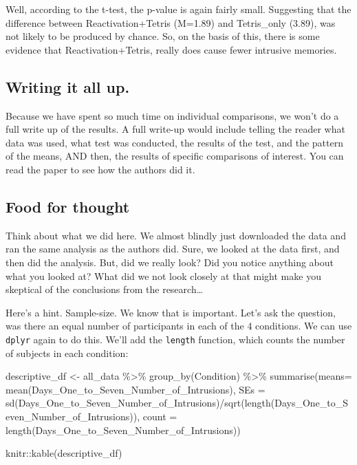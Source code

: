 \documentclass[
]{book}
\newenvironment{Shaded}{\begin{snugshade}}{\end{snugshade}}
\newcommand{\AttributeTok}[1]{\textcolor[rgb]{0.77,0.63,0.00}{#1}}
\newcommand{\FunctionTok}[1]{\textcolor[rgb]{0.00,0.00,0.00}{#1}}
\newcommand{\NormalTok}[1]{#1}
\newcommand{\OtherTok}[1]{\textcolor[rgb]{0.56,0.35,0.01}{#1}}
\newcommand{\SpecialCharTok}[1]{\textcolor[rgb]{0.00,0.00,0.00}{#1}}
\begin{document}
Well, according to the t-test, the p-value is again fairly small. Suggesting that the difference between Reactivation+Tetris (M=1.89) and Tetris\_only (3.89), was not likely to be produced by chance. So, on the basis of this, there is some evidence that Reactivation+Tetris, really does cause fewer intrusive memories.

\hypertarget{writing-it-all-up.}{%
\subsection{Writing it all up.}\label{writing-it-all-up.}}

Because we have spent so much time on individual comparisons, we won't do a full write up of the results. A full write-up would include telling the reader what data was used, what test was conducted, the results of the test, and the pattern of the means, AND then, the results of specific comparisons of interest. You can read the paper to see how the authors did it.

\hypertarget{food-for-thought}{%
\subsection{Food for thought}\label{food-for-thought}}

Think about what we did here. We almost blindly just downloaded the data and ran the same analysis as the authors did. Sure, we looked at the data first, and then did the analysis. But, did we really look? Did you notice anything about what you looked at? What did we not look closely at that might make you skeptical of the conclusions from the research\ldots{}

Here's a hint. Sample-size. We know that is important. Let's ask the question, was there an equal number of participants in each of the 4 conditions. We can use \texttt{dplyr} again to do this. We'll add the \texttt{length} function, which counts the number of subjects in each condition:

\begin{Shaded}
\begin{Highlighting}[]
\NormalTok{descriptive\_df }\OtherTok{\textless{}{-}}\NormalTok{ all\_data }\SpecialCharTok{\%\textgreater{}\%} 
                    \FunctionTok{group\_by}\NormalTok{(Condition) }\SpecialCharTok{\%\textgreater{}\%} 
                    \FunctionTok{summarise}\NormalTok{(}\AttributeTok{means=} \FunctionTok{mean}\NormalTok{(Days\_One\_to\_Seven\_Number\_of\_Intrusions),}
                              \AttributeTok{SEs =} \FunctionTok{sd}\NormalTok{(Days\_One\_to\_Seven\_Number\_of\_Intrusions)}\SpecialCharTok{/}\FunctionTok{sqrt}\NormalTok{(}\FunctionTok{length}\NormalTok{(Days\_One\_to\_Seven\_Number\_of\_Intrusions)),}
                              \AttributeTok{count =} \FunctionTok{length}\NormalTok{(Days\_One\_to\_Seven\_Number\_of\_Intrusions))}

\NormalTok{knitr}\SpecialCharTok{::}\FunctionTok{kable}\NormalTok{(descriptive\_df)}
\end{Highlighting}
\end{Shaded}
\end{document}
